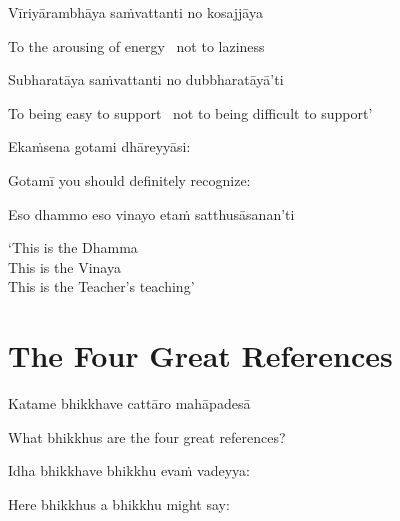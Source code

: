 Vīriyārambhāya saṁvattanti no kosajjāya

\begin{cprenglish}
  To the arousing of energy \breathmark\ not to laziness
\end{cprenglish}

Subharatāya saṁvattanti no dubbharatāyā’ti

\begin{cprenglish}
  To being easy to support \breathmark\ not to being difficult to support’
\end{cprenglish}

Ekaṁsena gotami dhāreyyāsi:

\begin{cprenglish}
  Gotamī
  you should definitely recognize:
\end{cprenglish}

Eso dhammo eso vinayo etaṁ satthusāsanan’ti

\begin{cprenglish}
  ‘This is the Dhamma\\
  This is the Vinaya\\
  This is the Teacher’s teaching’
\end{cprenglish}

\suttaRef{[AN 8.53]}

\clearpage

\section{The Four Great References}
\label{four-great-references}

\begin{leader}
\end{leader}

Katame bhikkhave cattāro mahāpadesā

\begin{cprenglish}
  What bhikkhus are the four great references?
\end{cprenglish}

Idha bhikkhave bhikkhu evaṁ vadeyya:

\begin{cprenglish}
  Here bhikkhus a bhikkhu might say:
\end{cprenglish}

